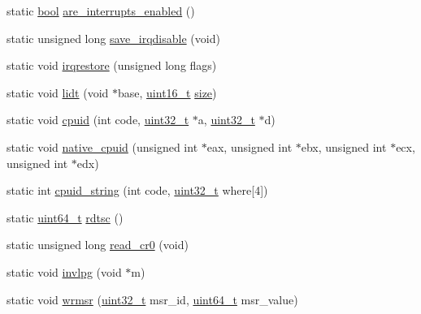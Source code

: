 \begin{DoxyCompactItemize}
\item 
static \hyperlink{a00038_af6a258d8f3ee5206d682d799316314b1_af6a258d8f3ee5206d682d799316314b1}{bool} \hyperlink{a00014_ae7df27a6150c6a020eead928af349b21_ae7df27a6150c6a020eead928af349b21}{are\+\_\+interrupts\+\_\+enabled} ()
\item 
static unsigned long \hyperlink{a00014_ab1dca2d7fd57d56f7548a81ef081ba74_ab1dca2d7fd57d56f7548a81ef081ba74}{save\+\_\+irqdisable} (void)
\item 
static void \hyperlink{a00014_a7dd6b2cd918b8cbca3c8b0381628ca83_a7dd6b2cd918b8cbca3c8b0381628ca83}{irqrestore} (unsigned long flags)
\item 
static void \hyperlink{a00014_a31967dec32575d3d398e6d289e888d1f_a31967dec32575d3d398e6d289e888d1f}{lidt} (void $\ast$base, \hyperlink{a00038_adf4d876453337156dde61095e1f20223_adf4d876453337156dde61095e1f20223}{uint16\+\_\+t} \hyperlink{a00002_aac913b3a1f6ef005d66bf7a84428773e_aac913b3a1f6ef005d66bf7a84428773e}{size})
\item 
static void \hyperlink{a00014_adacb2a50c30267ac5314bfcb92ac1d85_adacb2a50c30267ac5314bfcb92ac1d85}{cpuid} (int code, \hyperlink{a00038_a435d1572bf3f880d55459d9805097f62_a435d1572bf3f880d55459d9805097f62}{uint32\+\_\+t} $\ast$a, \hyperlink{a00038_a435d1572bf3f880d55459d9805097f62_a435d1572bf3f880d55459d9805097f62}{uint32\+\_\+t} $\ast$d)
\item 
static void \hyperlink{a00014_a3e1ee5b4e7cf5886c073da5f5f1b74eb_a3e1ee5b4e7cf5886c073da5f5f1b74eb}{native\+\_\+cpuid} (unsigned int $\ast$eax, unsigned int $\ast$ebx, unsigned int $\ast$ecx, unsigned int $\ast$edx)
\item 
static int \hyperlink{a00014_a9091114e1347758f7e3cd993169a5764_a9091114e1347758f7e3cd993169a5764}{cpuid\+\_\+string} (int code, \hyperlink{a00038_a435d1572bf3f880d55459d9805097f62_a435d1572bf3f880d55459d9805097f62}{uint32\+\_\+t} where\mbox{[}4\mbox{]})
\item 
static \hyperlink{a00038_aaa5d1cd013383c889537491c3cfd9aad_aaa5d1cd013383c889537491c3cfd9aad}{uint64\+\_\+t} \hyperlink{a00014_a47b9d70be3022fd0b5687d9794ca47bc_a47b9d70be3022fd0b5687d9794ca47bc}{rdtsc} ()
\item 
static unsigned long \hyperlink{a00014_ac85e095222f364961e091702bb6bc2ff_ac85e095222f364961e091702bb6bc2ff}{read\+\_\+cr0} (void)
\item 
static void \hyperlink{a00014_a20faed26baa341152aa32288418f1457_a20faed26baa341152aa32288418f1457}{invlpg} (void $\ast$m)
\item 
static void \hyperlink{a00014_a368f08346121290f513a26011e0f68f8_a368f08346121290f513a26011e0f68f8}{wrmsr} (\hyperlink{a00038_a435d1572bf3f880d55459d9805097f62_a435d1572bf3f880d55459d9805097f62}{uint32\+\_\+t} msr\+\_\+id, \hyperlink{a00038_aaa5d1cd013383c889537491c3cfd9aad_aaa5d1cd013383c889537491c3cfd9aad}{uint64\+\_\+t} msr\+\_\+value)

\end{DoxyCompactItemize}

